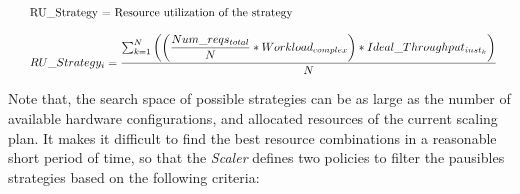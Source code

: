 {\scriptsize
\begin{equation}\label{resource_combination}
\resizebox{\linewidth}{!}{
\begin{tabular}{l@{}l@{}}
{\small RU\_Strategy = Resource utilization of the strategy } \\ \\
$RU\_Strategy_{i} = \dfrac{ \sum_{k=1}^N \bigg( \bigg( \dfrac{ Num\_reqs_{total} } {N}  * Workload_{complex} \bigg) * Ideal\_Throughput_{inst_{k}} \bigg) }  {N}$
\end{tabular}
}
\end{equation}
}




Note that, the search space of possible strategies can be as large as the number of available hardware configurations, and allocated resources of the current scaling plan. It makes it difficult to find the best resource combinations in a reasonable short period of time, so that the \emph{Scaler} defines two policies to filter the pausibles strategies based on the following criteria:


